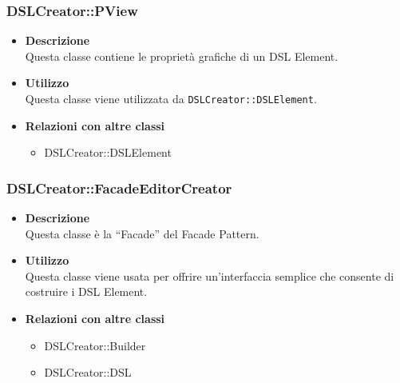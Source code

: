         \subsubsection{DSLCreator::PView}
        \begin{itemize}
        \item \textbf{Descrizione} \hfill \\
          Questa classe contiene le proprietà grafiche di un DSL Element.
        \item \textbf{Utilizzo}  \hfill \\
          Questa classe viene utilizzata da \texttt{DSLCreator::DSLElement}.
        \item \textbf{Relazioni con altre classi} \hfill 
          \begin{itemize}
          \item DSLCreator::DSLElement
          \end{itemize}
        \end{itemize}

        \subsubsection{DSLCreator::FacadeEditorCreator}
        \begin{itemize}
        \item \textbf{Descrizione} \hfill \\
          Questa classe è la ``Facade'' del Facade Pattern.
        \item \textbf{Utilizzo}  \hfill \\
          Questa classe viene usata per offrire un'interfaccia semplice che consente di costruire i DSL Element.
        \item \textbf{Relazioni con altre classi} \hfill 
          \begin{itemize}
          \item DSLCreator::Builder
          \item DSLCreator::DSL
          \end{itemize}
        \end{itemize}

